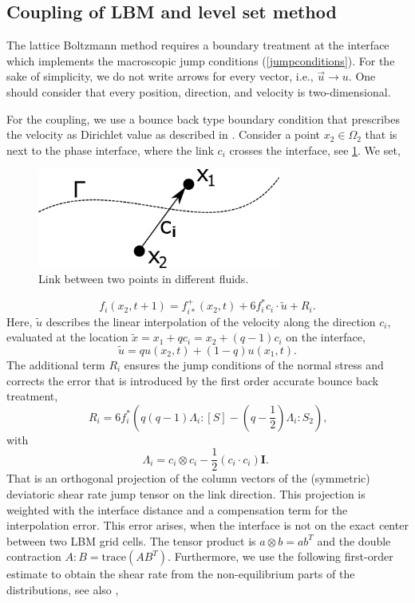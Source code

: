 \documentclass[final,leqno,onefignum,onetabnum]{siamltexmm}
\begin{document}
\subsection{Coupling of LBM and level set method}
The lattice Boltzmann method requires a boundary treatment at the interface which implements the macroscopic jump conditions (\ref{jumpconditions}). For the sake of simplicity, we do not write arrows for every vector, i.e., $\vec{u} \rightarrow u$. One should consider that every position, direction, and velocity is two-dimensional. 

For the coupling, we use a bounce back type boundary condition that prescribes the velocity as Dirichlet value as described in \cite[p. 1146]{Thoemmes}. Consider a point $x_2 \in \Omega_2$ that is next to the phase interface, where the link $c_i$ crosses the interface, see \cref{coupling}. We set,
\begin{figure}
	\hfill\includegraphics[width=8cm,natwidth=437,natheight=178]{coupling.png}\hspace*{\fill}
	\caption{Link between two points in different fluids.}
	\label{coupling}
\end{figure}
\begin{equation}
	f_i(x_2,t+1) = f_{i*}^+(x_2,t) + 6f_i^*c_i \cdot \tilde{u} + R_i \text{.}
\end{equation}
Here, $\tilde{u}$ describes the linear interpolation of the velocity along the direction $c_i$, evaluated at the location $\tilde{x} = x_1 + qc_i = x_2 + (q-1)c_i$ on the interface,
$$
\tilde{u} = qu(x_2,t) + (1-q)u(x_1,t) \text{.}
$$
The additional term $R_i$ ensures the jump conditions of the normal stress and corrects the error that is introduced by the first order accurate bounce back treatment,
\begin{equation}
  R_i = 6f_i^* \left(q(q-1)\Lambda_i:[S] - (q-\frac12)\Lambda_i:S_2 \right) \text{,}
  \label{R_i}
\end{equation}
with
\begin{equation}
  \Lambda_i = c_i \otimes c_i - \frac12 (c_i \cdot c_i) \mathbf{I} \text{. }
\end{equation}
That is an orthogonal projection of the column vectors of the (symmetric) deviatoric shear rate jump tensor on the link direction. This projection is weighted with the interface distance and a compensation term for the interpolation error. This error arises, when the interface is not on the exact center between two LBM grid cells. The tensor product is $a \otimes b = ab^T$ and the double contraction $A:B = \mathrm{trace}(AB^T)$. Furthermore, we use the following first-order estimate to obtain the shear rate from the non-equilibrium parts of the distributions, see also \cite{Krueger},
\end{document}
